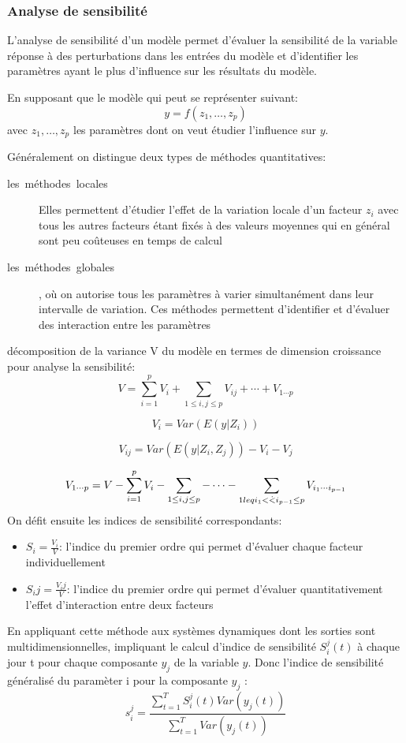 \subsubsection{Analyse de sensibilité}
L'analyse de sensibilité d'un modèle permet d'évaluer la sensibilité de la
variable réponse à des perturbations dans les entrées du modèle et
d'identifier les paramètres ayant le plus d'influence
sur les résultats du modèle.

En supposant que le modèle qui peut se représenter suivant:
\[
  y = f(z_1,\dots,z_p)
\]
avec $z_1,\dots ,z_p$ les paramètres dont on veut étudier l'influence sur $y$.

Généralement on distingue deux types de méthodes quantitatives:
\begin{description}
  \item[les\ méthodes\ locales] Elles permettent d'étudier l'effet de la
variation locale d'un facteur $z_i$ avec tous les autres facteurs étant fixés à des valeurs moyennes qui en général sont peu coûteuses en temps de calcul
\item[les\ méthodes\ globales], où on autorise tous les paramètres à varier simultanément dans leur intervalle de variation. Ces méthodes permettent d'identifier et d'évaluer des interaction entre les paramètres
\end{description}
 décomposition de la variance V du modèle en termes de dimension croissance pour analyse la sensibilité:
\[ {V}=\sum_{i=1}^pV_i+\sum_{1\leq i,j \leq p} V_{ij}+\cdots +V_{1\cdots p}\]

\[ {V_i}=Var(E(y|Z_i))\]

\[ {V_{ij}}=Var(E(y|Z_i,Z_j))-V_i-V_j \]

\[ {V_{1\cdots p}}=V-\sum_{i=1}^p V_i-\sum_{1\leq i,j \leq p}-\cdots -\sum_{1\\leq i_1<\dot <i_{p-1}\leq p} V_{i_1 \cdots i_{p-1}} \]
On défit ensuite les indices de sensibilité correspondants:
\begin{itemize}
\item $S_i=\frac{V_i}{V}$: l'indice du premier ordre qui permet d'évaluer chaque facteur individuellement
\item $S_ij=\frac{V_ij}{V}$: l'indice du premier ordre qui permet d'évaluer quantitativement l'effet d'interaction entre deux facteurs
\end{itemize}
En appliquant cette méthode aux systèmes dynamiques dont les sorties sont multidimensionnelles, impliquant le calcul d'indice de sensibilité $S_i^j(t)$ à chaque jour t pour chaque composante $y_j$ de la variable $y$.
Donc l'indice de sensibilité généralisé du paramèter i  pour la composante $y_j$ :
\[ {s_i^j}=\frac{\sum_{t=1}^TS_i^j(t)Var(y_j(t))}{\sum_{t=1}^T Var(y_j(t))} \]